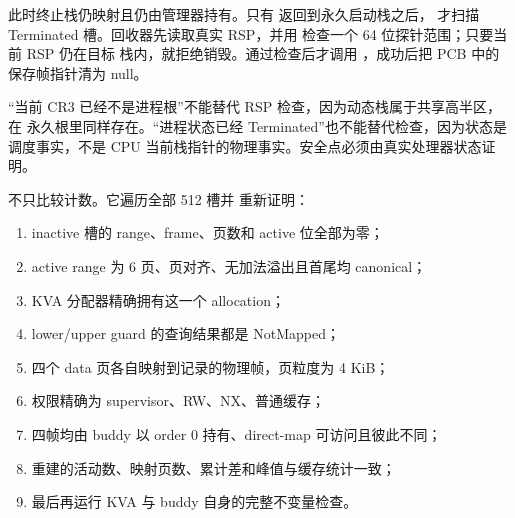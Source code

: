 此时终止栈仍映射且仍由管理器持有。只有
 返回到永久启动栈之后，
 才扫描 Terminated 槽。回收器先读取真实
RSP，并用  检查一个 64 位探针范围；只要当前 RSP 仍在目标
栈内，就拒绝销毁。通过检查后才调用 ，成功后把 PCB 中的
保存帧指针清为 null。

\begin{center}
\end{center}

“当前 CR3 已经不是进程根”不能替代 RSP 检查，因为动态栈属于共享高半区，在
永久根里同样存在。“进程状态已经 Terminated”也不能替代检查，因为状态是
调度事实，不是 CPU 当前栈指针的物理事实。安全点必须由真实处理器状态证明。

 不只比较计数。它遍历全部 512 槽并
重新证明：

\begin{enumerate}[label=\arabic*.]
  \item inactive 槽的 range、frame、页数和 active 位全部为零；
  \item active range 为 6 页、页对齐、无加法溢出且首尾均 canonical；
  \item KVA 分配器精确拥有这一个 allocation；
  \item lower/upper guard 的查询结果都是 NotMapped；
  \item 四个 data 页各自映射到记录的物理帧，页粒度为 4 KiB；
  \item 权限精确为 supervisor、RW、NX、普通缓存；
  \item 四帧均由 buddy 以 order 0 持有、direct-map 可访问且彼此不同；
  \item 重建的活动数、映射页数、累计差和峰值与缓存统计一致；
  \item 最后再运行 KVA 与 buddy 自身的完整不变量检查。
\end{enumerate}

